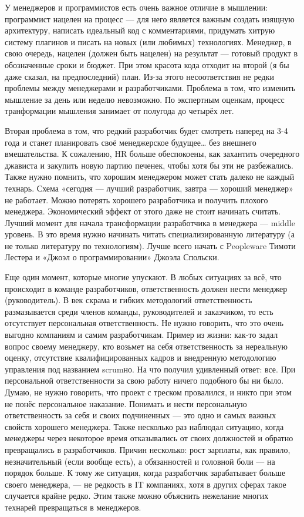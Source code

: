 \documentclass{../industrial-development}
\begin{document}
У менеджеров и программистов есть очень важное отличие в мышлении: программист нацелен на процесс — для него является важным создать изящную архитектуру, написать идеальный код с комментариями, придумать хитрую систему плагинов и писать на новых (или любимых) технологиях. Менеджер, в свою очередь, нацелен (должен быть нацелен) на результат — готовый продукт в обозначенные сроки и бюджет. При этом красота кода отходит на второй (я бы даже сказал, на предпоследний) план. Из-за этого несоответствия не редки проблемы между менеджерами и разработчиками.
Проблема в том, что изменить мышление за день или неделю невозможно. По экспертным оценкам, процесс транформации мышления занимает от полугода до четырёх лет.

Вторая проблема в том, что редкий разработчик будет смотреть наперед на 3-4 года и станет планировать своё менеджерское будущее… без внешнего вмешательства. К сожалению, HR больше обеспокоены, как захантить очередного джависта и закупить новую партию печенек, чтобы хотя бы эти не разбежались.
Также нужно помнить, что хорошим менеджером может стать далеко не каждый технарь. Схема «сегодня — лучший разработчик, завтра — хороший менеджер» не работает. Можно потерять хорошего разработчика и получить плохого менеджера. Экономический эффект от этого даже не стоит начинать считать.
Лучший момент для начала трансформации разработчика в менеджера — middle уровень. В это время нужно начинать читать специализированную литературу (а не только литературу по технологиям). Лучше всего начать с Peopleware Тимоти Лестера и «Джоэл о программировании» Джоэла Спольски. 

Еще один момент, которые многие упускают. В любых ситуациях за всё, что происходит в команде разработчиков, ответственность должен нести менеджер (руководитель).
В век скрама и гибких методологий ответственность размазывается среди членов команды, руководителей и заказчиком, то есть отсутствует персональная ответственность. Не нужно говорить, что это очень выгодно компаниям и самим разработчикам.
Пример из жизни: как-то задал вопрос своему менеджеру, кто возьмет на себя ответственность за нереальную оценку, отсутствие квалифицированных кадров и внедренную методологию управления под названием scrumно. На что получил удивленный ответ: все. При персональной ответственности за свою работу ничего подобного бы ни было. Думаю, не нужно говорить, что проект с треском провалился, и никто при этом не понёс персональное наказание.
Понимать и нести персональную ответственность за себя и своих подчиненных — это одно и самых важных свойств хорошего менеджера.
Также несколько раз наблюдал ситуацию, когда менеджеры через некоторое время отказывались от своих должностей и обратно превращались в разработчиков. Причин несколько: рост зарплаты, как правило, незначительный (если вообще есть), а обязанностей и головной боли — на порядок больше.
К тому же ситуация, когда разработчик зарабатывает больше своего менеджера, — не редкость в IT компаниях, хотя в других сферах такое случается крайне редко. Этим также можно объяснить нежелание многих технарей превращаться в менеджеров.
~\cite{How_to_be_a_good_IT-manager}
\end{document}
